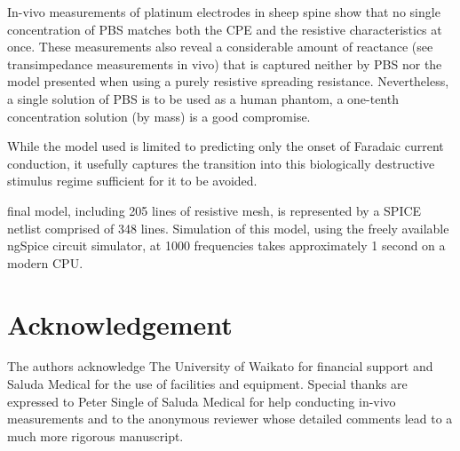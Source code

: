 \documentclass[journal, a4paper]{IEEEtran}
\begin{document}
In-vivo measurements of platinum electrodes in sheep spine show that no single concentration of PBS matches both the CPE and the resistive characteristics at once. These measurements also reveal a considerable amount of reactance (see transimpedance measurements in vivo) that is captured neither by PBS nor the model presented when using a purely resistive spreading resistance. Nevertheless, a single solution of PBS is to be used as a human phantom, a one-tenth concentration solution (by mass) is a good compromise.

    While the model used is limited to predicting only the onset of Faradaic current conduction, it usefully captures the transition into this biologically destructive stimulus regime sufficient for it to be avoided. 
    
final model, including 205 lines of resistive mesh, is represented by a SPICE netlist comprised of 348 lines. Simulation of this model, using the freely available ngSpice circuit simulator, at 1000 frequencies takes approximately 1 second on a modern CPU.

\section*{Acknowledgement}
The authors acknowledge The University of Waikato for financial support and Saluda Medical for the use of facilities and equipment. Special thanks are expressed to Peter Single of Saluda Medical for help conducting in-vivo measurements and to the anonymous reviewer whose detailed comments lead to a much more rigorous manuscript.
\end{document}
